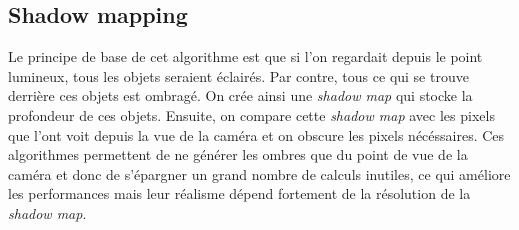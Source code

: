 \documentclass[a4paper,10pt]{report}
\begin{document}
\subsection{Shadow mapping}

Le principe de base de cet algorithme est que si l'on regardait depuis le point lumineux, tous les objets seraient éclairés. Par contre, tous ce qui se trouve derrière ces objets est ombragé. On crée ainsi une \textit{shadow map} qui stocke la profondeur de ces objets. Ensuite, on compare cette \textit{shadow map} avec les pixels que l'ont voit depuis la vue de la caméra et on obscure les pixels nécéssaires.
Ces algorithmes permettent de ne générer les ombres que du point de vue de la caméra et donc de s'épargner un grand nombre de calculs inutiles, ce qui améliore les performances mais leur réalisme dépend fortement de la résolution de la \textit{shadow map}.




\end{document}
